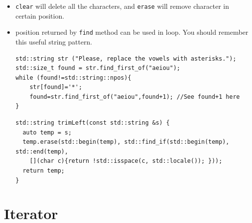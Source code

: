 \documentclass[a4paper,11pt,twoside]{book}
\begin{document}
\begin{itemize}
	\item \texttt{clear} will delete all the characters, and \texttt{erase} will remove character in certain position.
	
	\item position returned by \texttt{find} method can be used in loop. You should remember this useful string pattern.
\begin{lstlisting}[numbers=none]
std::string str ("Please, replace the vowels with asterisks.");
std::size_t found = str.find_first_of("aeiou");
while (found!=std::string::npos){
	str[found]='*';
	found=str.find_first_of("aeiou",found+1); //See found+1 here
}
\end{lstlisting}

\begin{lstlisting}[numbers=none]
std::string trimLeft(const std::string &s) {
  auto temp = s;
  temp.erase(std::begin(temp), std::find_if(std::begin(temp), std::end(temp), 
    [](char c){return !std::isspace(c, std::locale()); }));
  return temp;
}
\end{lstlisting}
	
\end{itemize}

\section{Iterator}
\end{document}
